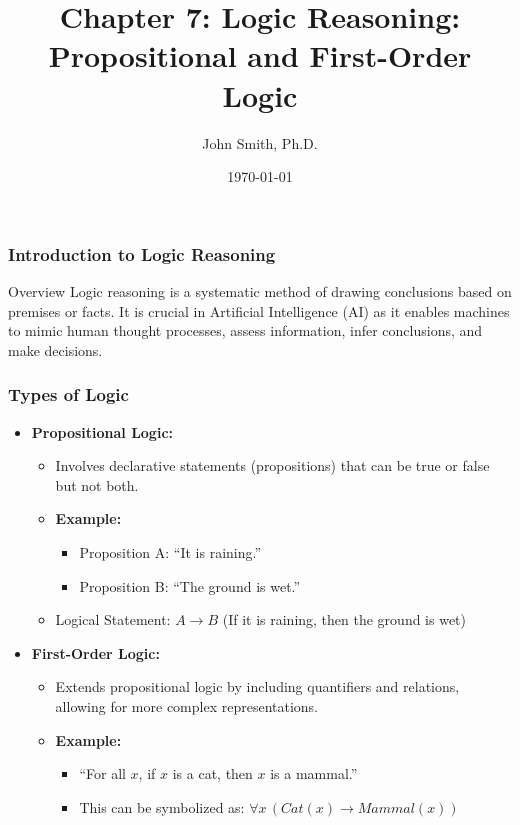 \documentclass[aspectratio=169]{beamer}
\title[Logic Reasoning]{Chapter 7: Logic Reasoning: Propositional and First-Order Logic}
\author[J. Smith]{John Smith, Ph.D.}
\institute[University Name]{
  Department of Computer Science\\
  University Name\\
  \vspace{0.3cm}
  Email: email@university.edu\\
  Website: www.university.edu
}
\date{\today}
\begin{document}
\frame{\titlepage}

\begin{frame}[fragile]
    \frametitle{Introduction to Logic Reasoning}
    \begin{block}{Overview}
        Logic reasoning is a systematic method of drawing conclusions based on premises or facts. It is crucial in Artificial Intelligence (AI) as it enables machines to mimic human thought processes, assess information, infer conclusions, and make decisions.
    \end{block}
\end{frame}

\begin{frame}[fragile]
    \frametitle{Types of Logic}
    \begin{itemize}
        \item \textbf{Propositional Logic:}
        \begin{itemize}
            \item Involves declarative statements (propositions) that can be true or false but not both. 
            \item \textbf{Example:}
            \begin{itemize}
                \item Proposition A: ``It is raining.''
                \item Proposition B: ``The ground is wet.''
            \end{itemize}
            \item Logical Statement: $A \rightarrow B$ (If it is raining, then the ground is wet)
        \end{itemize}
        
        \item \textbf{First-Order Logic:}
        \begin{itemize}
            \item Extends propositional logic by including quantifiers and relations, allowing for more complex representations.
            \item \textbf{Example:}
            \begin{itemize}
                \item ``For all $x$, if $x$ is a cat, then $x$ is a mammal.''
                \item This can be symbolized as: $\forall x \, (Cat(x) \rightarrow Mammal(x))$
            \end{itemize}
        \end{itemize}
    \end{itemize}
\end{frame}
\end{document}

